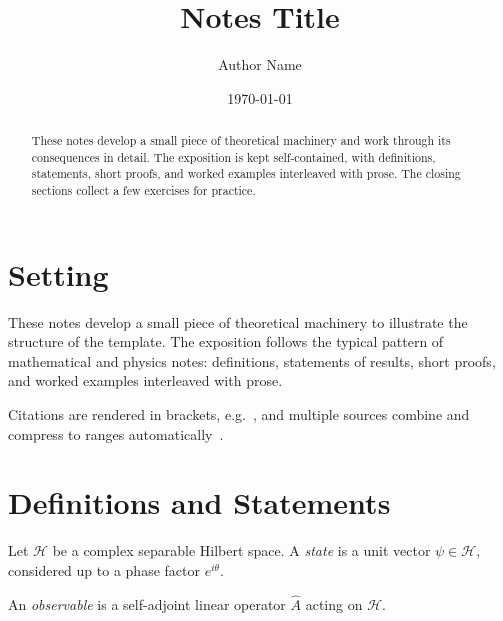 \documentclass[a4paper,11pt]{article}
\title{Notes Title}
\author{Author Name}
\date{\today}
\begin{document}
\maketitle

\begin{abstract}
These notes develop a small piece of theoretical machinery and
work through its consequences in detail. The exposition is kept
self-contained, with definitions, statements, short proofs, and
worked examples interleaved with prose. The closing sections
collect a few exercises for practice.
\end{abstract}

\clearpage
\framedtoc
\clearpage


\section{Setting}

These notes develop a small piece of theoretical machinery to
illustrate the structure of the template. The exposition follows
the typical pattern of mathematical and physics notes: definitions,
statements of results, short proofs, and worked examples interleaved
with prose.

Citations are rendered in brackets, e.g.\ \cite{example-article}, and
multiple sources combine and compress to ranges
automatically~\cite{example-article,example-book}.


\section{Definitions and Statements}

\begin{important}
\begin{definition}
  Let $\mathcal{H}$ be a complex separable Hilbert space. A
  \emph{state} is a unit vector $\psi \in \mathcal{H}$, considered
  up to a phase factor $e^{i\theta}$.
\end{definition}
\end{important}

\begin{definition}
  An \emph{observable} is a self-adjoint linear operator $\hat{A}$
  acting on $\mathcal{H}$.
\end{definition}
\end{document}
